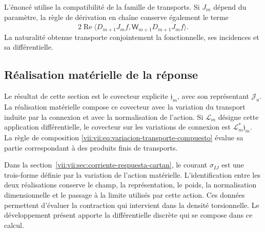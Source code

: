 L'énoncé utilise la compatibilité de la famille de transports. Si \(J_m\) dépend du paramètre, la règle de dérivation en chaîne conserve également le terme
\[
 2\operatorname{Re}
 \langle D_{m+1}J_mf,\mathsf W_{m+1}D_{m+1}\dot J_mf\rangle.
\]
La naturalité obtenue transporte conjointement la fonctionnelle, ses
incidences et sa différentielle.

\subsection{Réalisation matérielle de la réponse}
\label{vii:vii:subsec:realizacion-respuesta-discreta}

Le résultat de cette section est le covecteur explicite
\(\mathfrak j_m\), avec son représentant \(\mathcal J_a\).
La réalisation matérielle compose ce covecteur avec la variation du
transport induite par la connexion et avec la normalisation de l'action.
Si \(\mathcal L_m\) désigne cette application différentielle, le covecteur sur
les variations de connexion est \(\mathcal L_m^*\mathfrak j_m\).
La règle de composition
\eqref{vii:vii:eq:variacion-transporte-compuesto} évalue sa partie
correspondant à des produits finis de transports.

Dans la section~\ref{vii:vii:sec:corriente-respuesta-cartan}, le courant
\(\sigma_{IJ}\) est une trois-forme définie par la variation de l'action
matérielle. L'identification entre les deux réalisations conserve le champ,
la représentation, le poids, la normalisation dimensionnelle et le passage à la
limite utilisés par cette action. Ces données permettent d'évaluer la
contraction qui intervient dans la densité torsionnelle. Le développement
présent apporte la différentielle discrète qui se compose dans ce calcul.
